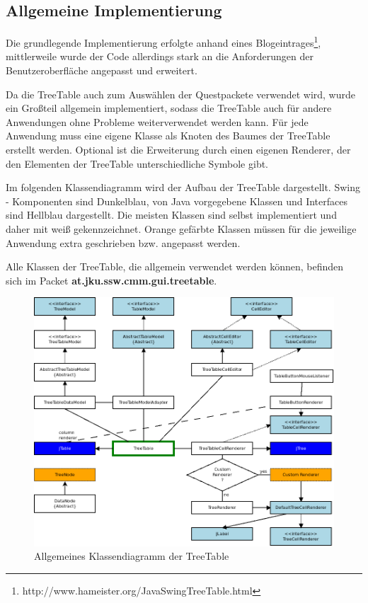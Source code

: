 \subsection{Allgemeine Implementierung}
Die grundlegende Implementierung erfolgte anhand eines Blogeintrages\footnote{http://www.hameister.org/JavaSwingTreeTable.html}, mittlerweile wurde der Code allerdings stark an die Anforderungen der Benutzeroberfläche angepasst und erweitert.

Da die TreeTable auch zum Auswählen der Questpackete verwendet wird, wurde ein Großteil allgemein implementiert, sodass die TreeTable auch für andere Anwendungen ohne Probleme weiterverwendet werden kann. Für jede Anwendung muss eine eigene Klasse als Knoten des Baumes der TreeTable erstellt werden. Optional ist die Erweiterung durch einen eigenen Renderer, der den Elementen der TreeTable unterschiedliche Symbole gibt.

Im folgenden Klassendiagramm wird der Aufbau der TreeTable dargestellt. Swing - Komponenten sind Dunkelblau, von Java vorgegebene Klassen und Interfaces sind Hellblau dargestellt. Die meisten Klassen sind selbst implementiert und daher mit weiß gekennzeichnet. Orange gefärbte Klassen müssen für die jeweilige Anwendung extra geschrieben bzw. angepasst werden.

Alle Klassen der TreeTable, die allgemein verwendet werden können, befinden sich im Packet \textbf{at.jku.ssw.cmm.gui.treetable}.

\begin{figure}
\includegraphics[width=\textwidth]{./media/images/gui/var/TreeTableClassesRaw.png}
\caption{Allgemeines Klassendiagramm der TreeTable}
\label{fig:deb-var-tt-class-raw}
\end{figure}

